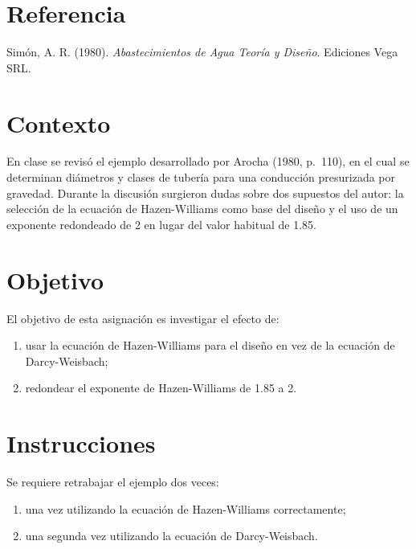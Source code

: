 \documentclass[12pt]{article}
\begin{document}

\section{Referencia}
Simón, A. R. (1980). \emph{Abastecimientos de Agua Teoría y Diseño}. Ediciones Vega SRL.

\section{Contexto}
En clase se revisó el ejemplo desarrollado por Arocha (1980, p.~110), en el cual se determinan diámetros y clases de tubería para una conducción presurizada por gravedad. Durante la discusión surgieron dudas sobre dos supuestos del autor: la selección de la ecuación de Hazen-Williams como base del diseño y el uso de un exponente redondeado de \num{2} en lugar del valor habitual de \num{1.85}.

\section{Objetivo}
El objetivo de esta asignación es investigar el efecto de:
\begin{enumerate}
\item usar la ecuación de Hazen-Williams para el diseño en vez de la ecuación de Darcy-Weisbach;
\item redondear el exponente de Hazen-Williams de \num{1.85} a \num{2}.
\end{enumerate}

\section{Instrucciones}
Se requiere retrabajar el ejemplo dos veces:
\begin{enumerate}
\item una vez utilizando la ecuación de Hazen-Williams correctamente;
\item una segunda vez utilizando la ecuación de Darcy-Weisbach.
\end{enumerate}
\end{document}
